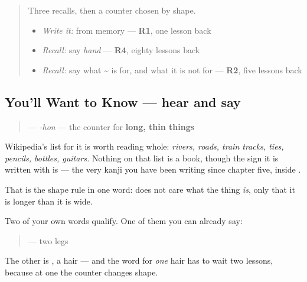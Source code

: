 \label{lesson:JA-C18-hon}



\begin{quote}
Three recalls, then a counter chosen by shape.

\begin{itemize}
\raggedright
  \item \emph{Write it:} \textbf{} from memory — \textbf{R1}, one lesson back
  \item \emph{Recall:} say \emph{hand} — \textbf{R4}, eighty lessons back
  \item \emph{Recall:} say what \textasciitilde{} is for, and what it is not for — \textbf{R2}, five lessons back
\end{itemize}
\end{quote}

\subsection*{You'll Want to Know — hear and say}
\begin{quote}
\textbf{} — \emph{-hon} — the counter for \textbf{long, thin things}
\end{quote}

Wikipedia's list for it is worth reading whole: \emph{rivers, roads, train tracks, ties, pencils, bottles, guitars.} Nothing on that list is a book, though the sign it is written with is \textbf{} — the very kanji you have been writing since chapter five, inside \textbf{}.

That is the shape rule in one word: \textbf{} does not care what the thing \emph{is}, only that it is longer than it is wide.

Two of your own words qualify. One of them you can already say:

\begin{quote}
\textbf{ } — two legs
\end{quote}

The other is \textbf{}, a hair — and the word for \emph{one} hair has to wait two lessons, because at one the counter changes shape.


